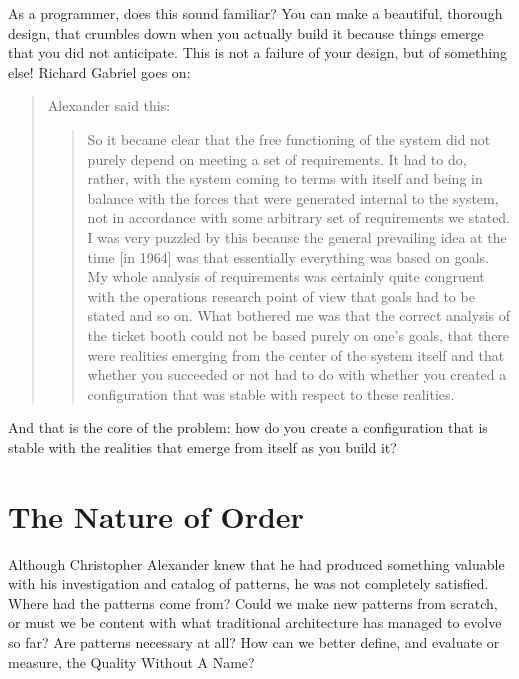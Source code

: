 As a programmer, does this sound familiar?  You can make a beautiful, thorough design, that crumbles down when you actually build it because things emerge that you did not anticipate. This is not a failure of your design, but of something else! Richard Gabriel goes on:
\begin{quote}
Alexander said this:
\begin{quote}
So it became clear that the free functioning of the system did not purely depend on meeting a set of requirements. It had to do, rather, with the system coming to terms with itself and being in balance with the forces that were generated internal to the system, not in accordance with some arbitrary set of requirements we stated. I was very puzzled by this because the general prevailing idea at the time [in 1964] was that essentially everything was based on goals. My whole analysis of requirements was certainly quite congruent with the operations research point of view that goals had to be stated and so on.  What bothered me was that the correct analysis of the ticket booth could not be based purely on one’s goals, that there were realities emerging from the center of the system itself and that whether you succeeded or not had to do with whether you created a configuration that was stable with respect to these realities.\end{quote}                                                                                                                                               \end{quote}
And that is the core of the problem:  how do you create a configuration that is stable with the realities that emerge from itself as you build it?

\section*{The Nature of Order}

Although Christopher Alexander knew that he had produced something valuable with his investigation and catalog of patterns, he was not completely satisfied. Where had the patterns come from? Could we make new patterns from scratch, or must we be content with what traditional architecture has managed to evolve so far? Are patterns necessary at all?  How can we better define, and evaluate or measure, the Quality Without A Name?

